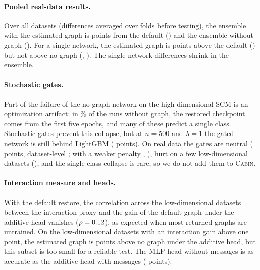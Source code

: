 \documentclass[anon,12pt]{clear2027} %
\newcommand{\Cabin}{\textsc{Cabin}}
\begin{document}
\paragraph{Pooled real-data results.}
Over all \RealPoolN{} datasets (differences averaged over folds before testing), the ensemble with the estimated graph is \RealPoolEnsEstLearned{} points from the default (\RealPoolEnsEstLearnedPe{}) and the ensemble without graph \RealPoolEnsNoneLearned{} (\RealPoolEnsNoneLearnedPe{}). For a single network, the estimated graph is \RealPoolSingleEstLearned{} points above the default (\RealPoolSingleEstLearnedPe{}) but not above no graph (\RealPoolSingleEstNone{}, \RealPoolSingleEstNonePe{}). The single-network differences shrink in the ensemble.

\paragraph{Stochastic gates.}
Part of the failure of the no-graph network on the high-dimensional SCM is an optimization artifact: in \SynHighEarlyRestore{}\% of the runs without graph, the restored checkpoint comes from the first five epochs, and many of these predict a single class. Stochastic gates prevent this collapse, but at $n=500$ and $\lambda=1$ the gated network is still behind LightGBM (\SynHighStgLgbNFiveHundredLamOne{} points). On real data the gates are neutral (\RealStgLearned{} points, dataset-level \RealStgLearnedPe{}; with a weaker penalty \RealStgLThreeLearned{}, \RealStgLThreeLearnedPe{}), hurt on a few low-dimensional datasets (\StgWorst{}), and the single-class collapse is rare, so we do not add them to \Cabin{}.

\paragraph{Interaction measure and heads.}
With the default restore, the correlation across the \RealNLow{} low-dimensional datasets between the interaction proxy and the gain of the default graph under the additive head vanishes ($\rho=0.12{}$), as expected when most returned graphs are untrained. On the \AddNInter{} low-dimensional datasets with an interaction gain above one point, the estimated graph is \RealAddInterEstimatedNone{} points above no graph under the additive head, but this subset is too small for a reliable test. The MLP head without messages is as accurate as the additive head with messages (\RealMlpMinusAddLearned{} points).
\end{document}
